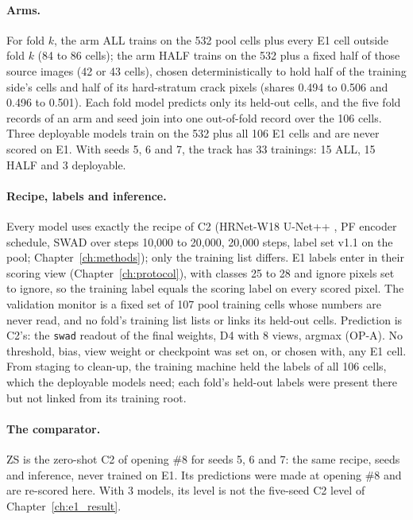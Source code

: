 \paragraph{Arms.} For fold $k$, the arm ALL trains on the 532 pool cells plus every E1 cell outside fold $k$ (84 to 86 cells);
the arm HALF trains on the 532 plus a fixed half of those source images (42 or 43 cells), chosen deterministically to hold half of
the training side's cells and half of its hard-stratum crack pixels (shares 0.494 to 0.506 and 0.496 to 0.501). Each fold model
predicts only its held-out cells, and the five fold records of an arm and seed join into one out-of-fold record over the 106
cells. Three deployable models train on the 532 plus all 106 E1 cells and are never scored on E1. With seeds 5, 6 and 7, the
track has 33 trainings: 15 ALL, 15 HALF and 3 deployable.

\paragraph{Recipe, labels and inference.} Every model uses exactly the recipe of C2 (HRNet-W18 U-Net++
\citep{wang2021hrnet,zhou2018unetpp}, PF encoder schedule, SWAD \citep{cha2021swad} over steps 10,000 to 20,000, 20,000 steps, label
set v1.1 on the pool; Chapter~\ref{ch:methods}); only the training list differs. E1 labels enter in their scoring view
(Chapter~\ref{ch:protocol}), with classes 25 to 28 and ignore pixels set to ignore, so the training label equals the scoring label
on every scored pixel. The validation monitor is a fixed set of 107 pool training cells whose numbers are never read, and no fold's
training list lists or links its held-out cells. Prediction is C2's: the \texttt{swad} readout of the final weights, D4 with 8
views, argmax (OP-A). No threshold, bias, view weight or checkpoint was set on, or chosen with, any E1 cell. From staging to
clean-up, the training machine held the labels of all 106 cells, which the deployable models need; each fold's held-out labels were
present there but not linked from its training root.

\paragraph{The comparator.} ZS is the zero-shot C2 of opening \#8 for seeds 5, 6 and 7: the same recipe, seeds and inference,
never trained on E1. Its predictions were made at opening \#8 and are re-scored here. With 3 models, its level is not the five-seed
C2 level of Chapter~\ref{ch:e1_result}.

